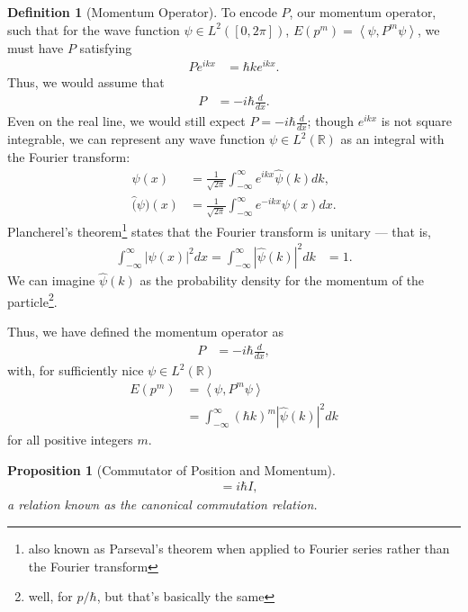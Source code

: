 \documentclass[10pt]{extarticle}
\newcommand{\R}{\mathbb{R}}
\newcommand{\iprod}[2]{\left\langle #1,#2\right\rangle}
\theoremstyle{plain}
\newtheorem*{proposition}{Proposition}%
\theoremstyle{definition}
\newtheorem*{definition}{Definition}
\theoremstyle{remark}
\renewcommand{\newline}{\hfill\break}
\begin{document}
  \begin{definition}[Momentum Operator]
    To encode $P$, our momentum operator, such that for the wave function $\psi\in L^{2}([0,2\pi])$, $E(p^m) = \iprod{\psi}{P^{m}\psi}$, we must have $P$ satisfying
    \begin{align*}
      Pe^{ikx} &= \hbar k e^{ikx}.
    \end{align*}
    Thus, we would assume that
    \begin{align*}
      P &= -i\hbar \frac{d}{dx}.
    \end{align*}
    Even on the real line, we would still expect $P = -i\hbar \frac{d}{dx}$; though $e^{ikx}$ is not square integrable, we can represent any wave function $\psi \in L^{2}(\R)$ as an integral with the Fourier transform:
    \begin{align*}
      \psi(x) &= \frac{1}{\sqrt{2\pi}}\int_{-\infty}^{\infty}e^{ikx}\hat{\psi}(k)dk,\\
      \hat(\psi)(x) &= \frac{1}{\sqrt{2\pi}}\int_{-\infty}^{\infty}e^{-ikx}\psi(x)dx.
    \end{align*}
    Plancherel's theorem\footnote{also known as Parseval's theorem when applied to Fourier series rather than the Fourier transform} states that the Fourier transform is unitary --- that is,
    \begin{align*}
      \int_{-\infty}^{\infty}|\psi(x)|^2dx = \int_{-\infty}^{\infty}\left\vert \hat{\psi}(k) \right\vert^2dk &= 1.
    \end{align*}
    We can imagine $\hat{\psi}(k)$ as the probability density for the momentum of the particle\footnote{well, for $p/\hbar$, but that's basically the same}.\newline

    Thus, we have defined the momentum operator as
    \begin{align*}
      P &= -i\hbar \frac{d}{dx},
    \end{align*}
    with, for sufficiently nice $\psi\in L^{2}(\R)$
    \begin{align*}
      E(p^{m}) &= \iprod{\psi}{P^{m}\psi}\\
               &= \int_{-\infty}^{\infty}(\hbar k)^m \left\vert \hat{\psi}(k) \right\vert^2 dk
    \end{align*}
    for all positive integers $m$.
  \end{definition}
  \begin{proposition}[Commutator of Position and Momentum]
    \begin{align*}
      [X,P] &= i\hbar I,
    \end{align*}
    a relation known as the canonical commutation relation.
  \end{proposition}
\end{document}
